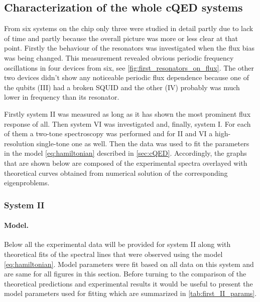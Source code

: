 \documentclass[12pt, twoside]{report}
\numberwithin{equation}{section}
\begin{document}
\subsection{Characterization of the whole cQED systems}

From six systems on the chip only three were studied in detail partly due to lack of time and partly because the overall picture was more or less clear at that point. Firstly the behaviour of the resonators was investigated when the flux bias was being changed. This measurement revealed obvious periodic frequency oscillations in four devices from six, see \autoref{fig:first_resonators_on_flux}. The other two devices didn't show any noticeable periodic flux dependence because one of the qubits (III) had a broken SQUID and the other (IV) probably was much lower in frequency than its resonator.

Firstly system II was measured as long as it has shown the most prominent flux response of all. Then system VI was investigated and, finally, system I. For each of them a two-tone spectroscopy was performed and for II and VI a high-resolution single-tone one as well. Then the data was used to fit the parameters in the model \eqref{eq:hamiltonian} described in \autoref{sec:cQED}. Accordingly, the graphs that are shown below are composed of the experimental spectra overlayed with theoretical curves obtained from numerical solution of the corresponding eigenproblems.

\subsubsection{System II}

\paragraph{Model.} Below all the experimental data will be provided for system II along with theoretical fits of the spectral lines that were observed using the model \eqref{eq:hamiltonian}. Model parameters were fit based on all data on this system and are same for all figures in this section. Before turning to the comparison of the theoretical predictions and experimental results it would be useful to present the model parameters used for fitting which are summarized in \autoref{tab:first_II_params}.
\end{document}
